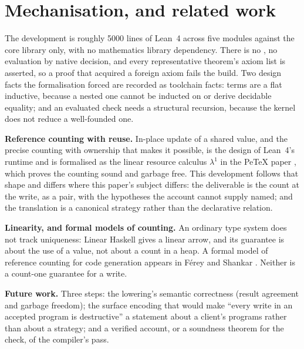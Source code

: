 \documentclass[11pt]{article}
\newcommand{\code}[1]{\texttt{\detokenize{#1}}}
\theoremstyle{remark}
\begin{document}
\section{Mechanisation, and related work}
\label{sec:future}

\noindent The development is roughly 5000 lines of Lean~4 across five modules
against the core library only, with no mathematics library dependency. There is no
\code{sorry}, no evaluation by native decision, and every representative theorem's
axiom list is asserted, so a proof that acquired a foreign axiom fails the build.
Two design facts the formalisation forced are recorded as toolchain facts: terms are
a flat inductive, because a nested one cannot be inducted on or derive decidable
equality; and an evaluated check needs a structural recursion, because the kernel
does not reduce a well-founded one.

\noindent \textbf{Reference counting with reuse.} In-place update of a shared value,
and the precise counting with ownership that makes it possible, is the design of
Lean~4's runtime \cite{ullrich19counting} and is formalised as the linear resource
calculus $\lambda^1$ in the Pe\TeX{} paper \cite{reinking21perceus}, which proves
the counting sound and garbage free. This development follows that shape and
differs where this paper's subject differs: the deliverable is the count at the
write, as a pair, with the hypotheses the account cannot supply named; and the
translation is a canonical strategy rather than the declarative relation.

\noindent \textbf{Linearity, and formal models of counting.} An ordinary type system
does not track uniqueness: Linear Haskell \cite{bernardy18linear} gives a linear
arrow, and its guarantee is about the use of a value, not about a count in a heap.
A formal model of reference counting for code generation appears in F\'erey and
Shankar \cite{ferrey16codegen}. Neither is a count-one guarantee for a write.

\noindent \textbf{Future work.} Three steps: the lowering's semantic correctness
(result agreement and garbage freedom); the surface encoding that would make ``every
write in an accepted program is destructive'' a statement about a client's programs
rather than about a strategy; and a verified account, or a soundness theorem for the
check, of the compiler's pass.
\end{document}
